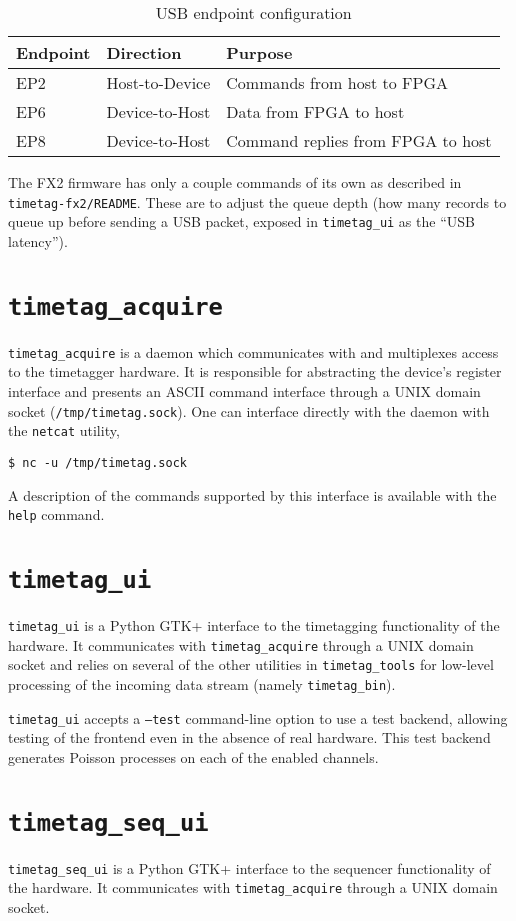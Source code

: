 \begin{table}
  \begin{tabular}{|lll|}
    \hline
    Endpoint & Direction      & Purpose \\
    \hline
    EP2      & Host-to-Device & Commands from host to FPGA \\
    EP6      & Device-to-Host & Data from FPGA to host \\
    EP8      & Device-to-Host & Command replies from FPGA to host \\
    \hline
  \end{tabular}
  \caption{USB endpoint configuration}
  \label{Table:Endpoints}
\end{table}

The FX2 firmware has only a couple commands of its own as described in
{\tt timetag-fx2/README}. These are to adjust the queue depth (how
many records to queue up before sending a USB packet, exposed in
{\tt timetag\_ui} as the ``USB latency'').

\section{\tt timetag\_acquire}
{\tt timetag\_acquire} is a daemon which communicates with and
multiplexes access to the timetagger hardware. It is responsible for
abstracting the device's register interface and presents an ASCII
command interface through a UNIX domain socket
({\tt /tmp/timetag.sock}). One can interface directly with the daemon
with the {\tt netcat} utility,

\begin{verbatim}
$ nc -u /tmp/timetag.sock
\end{verbatim}

A description of the commands supported by this interface is available
with the {\tt help} command.

\section{\tt timetag\_ui}

{\tt timetag\_ui} is a Python GTK+ interface to the timetagging
functionality of the hardware. It communicates with
{\tt timetag\_acquire} through a UNIX domain socket and relies on several
of the other utilities in {\tt timetag\_tools} for low-level
processing of the incoming data stream (namely {\tt timetag\_bin}).

{\tt timetag\_ui} accepts a {\tt --test} command-line option to use a
test backend, allowing testing of the frontend even in the absence of
real hardware. This test backend generates Poisson processes on each
of the enabled channels.

\section{\tt timetag\_seq\_ui}
{\tt timetag\_seq\_ui} is a Python GTK+ interface to the sequencer
functionality of the hardware. It communicates with
{\tt timetag\_acquire} through a UNIX domain socket.

